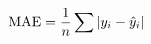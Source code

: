 \documentclass[preview]{standalone}
\begin{document}
\begin{align*}
\special{dvisvgm:raw <g id='unique000'>}\text{MAE} = \frac{1}{n} \sum |y_i - \hat{y}_i|\special{dvisvgm:raw </g>}
\end{align*}
\end{document}
